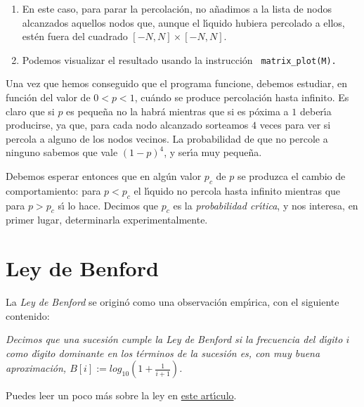 \begin{ejer}
\begin{enumerate}
\begin{enumerate}
\item En este caso, para parar la percolaci\'on, no a\~nadimos a la lista de 
nodos alcanzados aquellos nodos que, aunque
el l\'{\i}quido hubiera percolado a ellos, est\'en fuera del cuadrado $[-N, N 
]\times [-N, N ].$

\item Podemos visualizar el resultado usando la instrucci\'on {\tt 
matrix\_plot(M).}
\end{enumerate}
\end{enumerate}
Una vez que hemos conseguido que el programa funcione, debemos estudiar, en 
funci\'on del valor de $0< p< 1$, cu\'ando se produce percolaci\'on hasta 
infinito. Es claro que si $p$ es peque\~na no la habr\'a  mientras que si es 
p\'oxima a $1$ deber\'{\i}a producirse, ya que, para cada nodo alcanzado 
sorteamos $4$ veces para ver si percola a alguno de los nodos vecinos. La 
probabilidad de que no percole a ninguno sabemos que vale $(1-p)^4$, y 
ser\'{\i}a muy peque\~na.

Debemos esperar entonces que en alg\'un valor $p_c$  de $p$ se produzca el 
cambio de comportamiento: para $p<p_c$ el l\'{\i}quido no percola hasta 
infinito mientras que para $p>p_c$ s\'{\i} lo hace. Decimos que $p_c$ es la 
{\itshape probabilidad cr\'{\i}tica}, y nos interesa, en primer lugar, 
determinarla experimentalmente.
\end{ejer}



\section{Ley de Benford}

La {\itshape Ley de Benford} se origin\'o como una observaci\'on emp\'{\i}rica, 
con el siguiente contenido:

{\itshape Decimos que una sucesi\'on cumple la Ley de Benford si la frecuencia 
del d\'{\i}gito $i$ como d\'{\i}gito dominante en los t\'erminos de la 
sucesi\'on es, con muy buena aproximaci\'on,  $B[i]:=log_{10}(1+\frac{1}{i+1})$.
}

Puedes leer un poco m\'as sobre la ley en 
\href{http://150.244.21.37/PDFs/MISCE/benford.pdf}{este art\'{\i}culo}.

